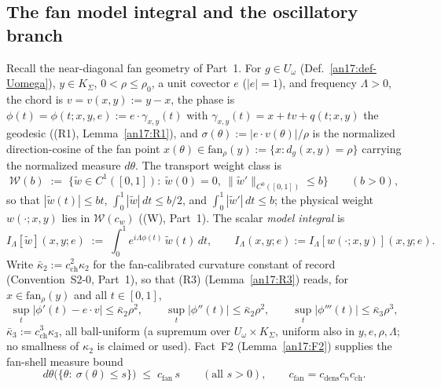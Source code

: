 \subsection{The fan model integral and the oscillatory branch}
\label{sec:an17-osc}

Recall the near-diagonal fan geometry of Part~1. For $g\in U_\omega$
(Def.~\ref{an17:def-Uomega}), $y\in K_\Sigma$, $0<\rho\le\rho_0$, a unit
covector $e$ ($|e|=1$), and frequency $\Lambda>0$, the chord is
$v=v(x,y):=y-x$, the phase is $\phi(t)=\phi(t;x,y,e):=e\cdot\gamma_{x,y}(t)$
with $\gamma_{x,y}(t)=x+tv+q(t;x,y)$ the geodesic ((R1),
Lemma~\ref{an17:R1}), and $\sigma(\theta):=|e\cdot v(\theta)|/\rho$ is the
normalized direction-cosine of the fan point $x(\theta)\in\mathrm{fan}_\rho(y)
:=\{x:d_g(x,y)=\rho\}$ carrying the normalized measure $d\theta$. The transport
weight class is
\begin{equation}\label{eq:an17-weightclass}
 \mathcal W(b)\;:=\;\bigl\{\tilde w\in C^1([0,1]):\ \tilde w(0)=0,\
 \|\tilde w'\|_{C^0([0,1])}\le b\bigr\}
 \qquad(b>0),
\end{equation}
so that $|\tilde w(t)|\le bt$, $\int_0^1|\tilde w|\,dt\le b/2$, and
$\int_0^1|\tilde w'|\,dt\le b$; the physical weight $w(\cdot;x,y)$ lies in
$\mathcal W(c_w)$ ((W), Part~1). The scalar \emph{model integral} is
\begin{equation}\label{eq:an17-model}
 I_\Lambda[\tilde w](x,y;e)\;:=\;\int_0^1 e^{i\Lambda\phi(t)}\,\tilde w(t)\,dt,
 \qquad
 I_\Lambda(x,y;e):=I_\Lambda[w(\cdot;x,y)](x,y;e).
\end{equation}
Write $\bar\kappa_2:=c_{\mathrm{ch}}^2\kappa_2$ for the fan-calibrated curvature
constant of record (Convention~S2-0, Part~1), so that (R3)
(Lemma~\ref{an17:R3}) reads, for $x\in\mathrm{fan}_\rho(y)$ and all $t\in[0,1]$,
\begin{equation}\label{eq:an17-R3cal}
 \sup_{t}\bigl|\phi'(t)-e\cdot v\bigr|\le\bar\kappa_2\rho^2,\qquad
 \sup_{t}\bigl|\phi''(t)\bigr|\le\bar\kappa_2\rho^2,\qquad
 \sup_{t}\bigl|\phi'''(t)\bigr|\le\bar\kappa_3\rho^3,
\end{equation}
$\bar\kappa_3:=c_{\mathrm{ch}}^3\kappa_3$, all ball-uniform (a supremum over
$U_\omega\times K_\Sigma$, uniform also in $y,e,\rho,\Lambda$; no smallness of
$\kappa_2$ is claimed or used). Fact~F2 (Lemma~\ref{an17:F2}) supplies the
fan-shell measure bound
\begin{equation}\label{eq:an17-F2}
 d\theta\bigl(\{\theta:\ \sigma(\theta)\le s\}\bigr)\;\le\;c_{\mathrm{fan}}\,s
 \qquad(\text{all }s>0),\qquad c_{\mathrm{fan}}=c_{\mathrm{dens}}c_nc_{\mathrm{ch}}.
\end{equation}

